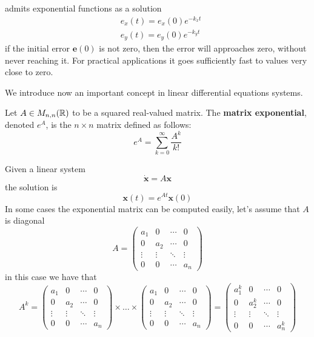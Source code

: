 \documentclass[10pt, letterpaper]{report}
\begin{document}
admits exponential functions as a solution\begin{align}
    &e_x(t)=e_x(0)e^{-k_xt}\\
    &e_y(t)=e_y(0)e^{-k_yt}
\end{align}
if the initial error $\mathbf e(0)$ is not zero, then the error will approaches zero, without never reaching it. For practical applications it goes sufficiently
fast to values very close to zero.\bigskip

\noindent We introduce now an important concept in linear differential equations systems.\begin{definition}
    Let $A\in M_{n,n}({\mathbb R})$ to be a squared real-valued matrix. The \textbf{matrix exponential}, denoted $e^A$, is the $n\times n$ matrix defined as follows:\begin{equation}
        e^A=\sum_{k=0}^\infty\frac{A^k}{k!}
    \end{equation}
\end{definition}
Given a linear system\begin{equation}
    \dot{\mathbf x}=A\mathbf x
\end{equation}
the solution is\begin{equation}
    \mathbf x(t)=e^{At}\mathbf x(0)
\end{equation}
In some cases the exponential matrix can be computed easily, let's assume that $A$ is diagonal\begin{equation}
    A=\begin{pmatrix}
a_1 & 0 & \cdots & 0 \\
0 & a_2 & \cdots & 0 \\
\vdots & \vdots & \ddots & \vdots \\
0 & 0 & \cdots & a_n
\end{pmatrix}
\end{equation}
in this case we have that\begin{equation}
    A^k=\begin{pmatrix}
a_1 & 0 & \cdots & 0 \\
0 & a_2 & \cdots & 0 \\
\vdots & \vdots & \ddots & \vdots \\
0 & 0 & \cdots & a_n
\end{pmatrix}\times  \dots \times \begin{pmatrix}
a_1 & 0 & \cdots & 0 \\
0 & a_2 & \cdots & 0 \\
\vdots & \vdots & \ddots & \vdots \\
0 & 0 & \cdots & a_n
\end{pmatrix} = \begin{pmatrix}
a_1^k & 0 & \cdots & 0 \\
0 & a_2^k & \cdots & 0 \\
\vdots & \vdots & \ddots & \vdots \\
0 & 0 & \cdots & a_n^k
\end{pmatrix}
\end{equation}
\end{document}
